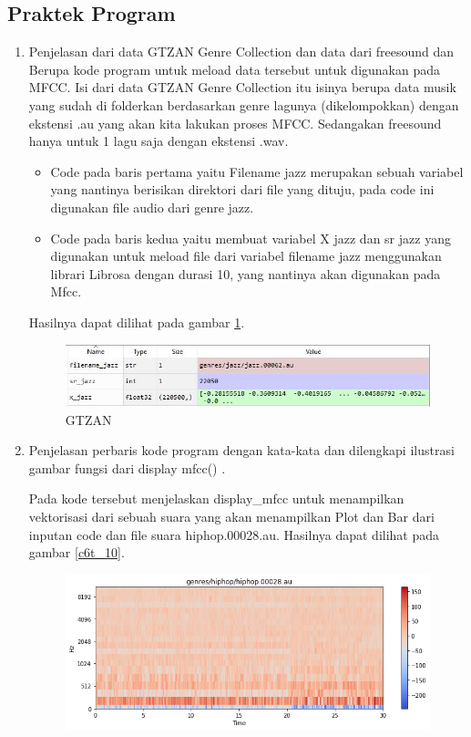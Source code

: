 \subsection{Praktek Program}
\begin{enumerate}
\item Penjelasan dari data GTZAN Genre Collection dan data dari freesound dan Berupa kode program untuk meload data tersebut untuk digunakan pada MFCC.
\subitem Isi dari data GTZAN Genre Collection itu isinya berupa data musik yang sudah di folderkan berdasarkan genre lagunya (dikelompokkan) dengan ekstensi .au yang akan kita lakukan proses MFCC. Sedangakan freesound hanya untuk 1 lagu saja dengan ekstensi .wav.

\begin{itemize}
\item Code pada baris pertama yaitu Filename jazz merupakan sebuah variabel yang nantinya berisikan direktori dari file yang dituju, pada code ini digunakan file audio dari genre jazz.
\item Code pada baris kedua yaitu membuat variabel X jazz dan sr jazz yang digunakan untuk meload file dari variabel filename jazz menggunakan librari Librosa dengan durasi 10, yang nantinya akan digunakan pada Mfcc.
\end{itemize}
\subitem Hasilnya dapat dilihat pada gambar \ref{c6t_9}.
\begin{figure}[!htbp]
\centerline{\includegraphics[width=1\textwidth]{figures/c6t/9.JPG}}
\caption{GTZAN}
\label{c6t_9}
\end{figure} 
\item Penjelasan perbaris kode program dengan kata-kata dan dilengkapi ilustrasi gambar fungsi dari display mfcc() .

\subitem Pada kode tersebut menjelaskan display\_mfcc untuk menampilkan vektorisasi dari sebuah suara yang akan menampilkan Plot dan Bar dari inputan code dan file suara hiphop.00028.au. Hasilnya dapat dilihat pada gambar \ref{c6t_10}.
\begin{figure}[!htbp]
\centerline{\includegraphics[width=1\textwidth]{figures/c6t/10.png}}

\end{figure}
\end{enumerate}
